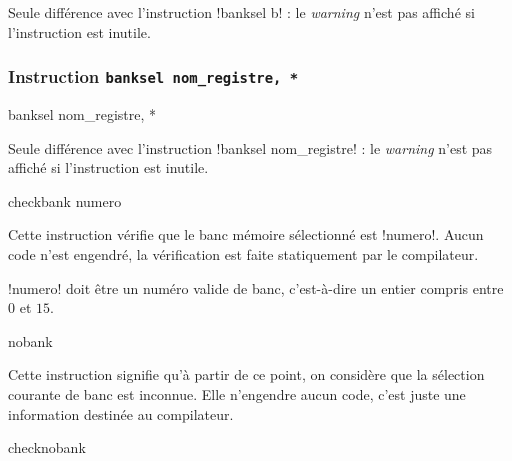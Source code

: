 Seule différence avec l'instruction \pic!banksel b! : le \emph{warning} n'est pas affiché si l'instruction est inutile.






\subsubsection{Instruction \texttt{banksel nom\_registre, *}}
\begin{piccolo}
banksel nom_registre, *
\end{piccolo}

Seule différence avec l'instruction \pic!banksel nom_registre! : le \emph{warning} n'est pas affiché si l'instruction est inutile.










\begin{piccolo}
checkbank numero
\end{piccolo}

Cette instruction vérifie que le banc mémoire sélectionné est \pic!numero!. Aucun code n'est engendré, la vérification est faite statiquement par le compilateur.

\pic!numero! doit être un numéro valide de banc, c'est-à-dire un entier compris entre $0$ et $15$.











\begin{piccolo}
nobank
\end{piccolo}

Cette instruction signifie qu'à partir de ce point, on considère que la sélection courante de banc est inconnue. Elle n'engendre aucun code, c'est juste une information destinée au compilateur.






\begin{piccolo}
checknobank
\end{piccolo}

